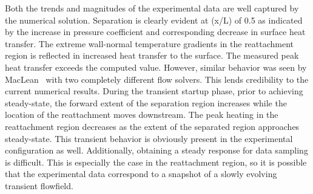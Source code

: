 Both the trends and magnitudes of the experimental data are well captured by the numerical solution.  Separation is clearly evident at (x/L) of 0.5 as indicated by the increase in pressure coefficient and corresponding decrease in surface heat transfer.  The extreme wall-normal temperature gradients in the reattachment region is reflected in increased heat transfer to the surface.  The measured peak heat transfer exceeds the computed value. However, similar behavior was seen by MacLean~\cite{maclean_AIAA-2004-529} with two completely different flow solvers. This lends credibility to the current numerical results. During the transient startup phase, prior to achieving steady-state, the forward extent of the separation region increases while the location of the reattachment moves downstream. The peak heating in the reattachment region decreases as the extent of the separated region approaches steady-state.   This transient behavior is obviously present in the experimental configuration as well. Additionally, obtaining a steady response for data sampling is difficult.  This is especially the case in the reattachment region, so it is possible that the experimental data correspond to a snapshot of a slowly evolving transient flowfield.

\clearpage
